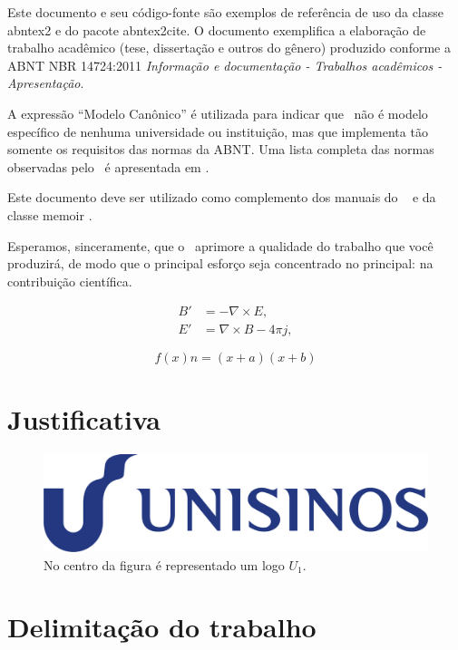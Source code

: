 Este documento e seu código-fonte são exemplos de referência de uso da classe \textsf{abntex2} e do pacote \textsf{abntex2cite}. O documento exemplifica a elaboração de trabalho acadêmico (tese, dissertação e outros do gênero) produzido conforme a ABNT NBR 14724:2011 \emph{Informação e documentação - Trabalhos acadêmicos - Apresentação}.

A expressão ``Modelo Canônico'' é utilizada para indicar que \abnTeX\ não é modelo específico de nenhuma universidade ou instituição, mas que implementa tão somente os requisitos das normas da ABNT. Uma lista completa das normas observadas pelo \abnTeX\ é apresentada em .

Este documento deve ser utilizado como complemento dos manuais do \abnTeX\ \cite{abntex2classe,abntex2cite,abntex2cite-alf} e da classe \textsf{memoir} \cite{memoir}. 

Esperamos, sinceramente, que o \abnTeX\ aprimore a qualidade do trabalho que você produzirá, de modo que o principal esforço seja concentrado no principal: na contribuição científica.


\begin{align}
  B'&=-\nabla \times E,\\
  E'&=\nabla \times B - 4\pi j,
\end{align}

\begin{equation} 
 f(x) n=(x+a)(x+b)
\end{equation}

\section{Justificativa}

\begin{figure}[htp]
	\centering
	\caption{\label{fig:met-disc-fig01} No centro da figura é representado um logo $U_1$.} 
	\includegraphics[width = 0.8\linewidth]{images/unisinos.png}
\end{figure}

\section{Delimitação do trabalho}

